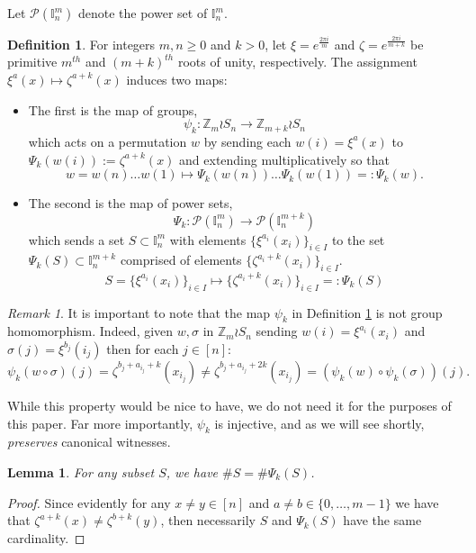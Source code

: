 \documentclass[12pt,reqno]{amsart}
\numberwithin{equation}{section}
\theoremstyle{plain}
\newtheorem{lemma}[theorem]{Lemma}
\theoremstyle{definition}
\newtheorem{definition}[theorem]{Definition}
\theoremstyle{remark}
\newtheorem{remark}[theorem]{Remark}
\newcommand{\Z}{\mathbb{Z}}
\newcommand{\I}{\mathbb{I}}
\begin{document}
Let $\mathcal{P}(\I_n^m)$ denote the power set of $\I_n^m$.

\begin{definition} \label{def:psi-map}
For integers $m,n\geq 0$ and $k>0$, let $\xi = e^{\frac{2\pi i}{ m}}$ and $\zeta = e^{\frac{2\pi i}{m+k}}$ be primitive $m^{th}$ and $(m+k)^{th}$ roots of unity, respectively. The assignment $\xi^{a}(x) \mapsto \zeta^{a+k}(x)$ induces two maps:
\begin{itemize}
\item[(I)] The first is the map of groups,  
\[\psi_k: \Z_{m} \wr S_n \longrightarrow \Z_{m+k }\wr S_n\]
which acts on a permutation $w$ by sending each $w(i)=\xi^a(x)$ to $\Psi_k(w(i)):= \zeta^{a+k}(x)$ and extending multiplicatively so that
\[
w=w(n)\dots w(1) \longmapsto \Psi_k(w(n)) \dots \Psi_k(w(1))=: \Psi_k(w).
\]
\item[(II)] The second is the map of power sets,
\[
\Psi_k: \mathcal{P}(\I_n^m) \longrightarrow \mathcal{P}(\I_n^{m+k})
\]
which sends a set $S \subset \I_n^m$ with elements $\{ \xi^{a_i}(x_i)\}_{i \in I}$ to the set $\Psi_k(S) \subset \I_n^{m+k}$ comprised of elements $\{ \zeta^{a_i+k}(x_i)\}_{i \in I}$.
\[
S = \{ \xi^{a_i}(x_i)\}_{i \in I} \longmapsto \{ \zeta^{a_i+k}(x_i)\}_{i \in I}=: \Psi_k(S)
\]
\end{itemize} 


\begin{remark}
It is important to note that the map $\psi_k$ in Definition \ref{def:psi-map} is not group homomorphism. Indeed, given $w, \sigma$ in $\Z_m\wr S_n$ sending $w(i)=\xi^{a_i}(x_i)$ and $\sigma(j)=\xi^{b_j}(i_j)$ then for each $j \in [n]$:
\[\psi_k(w \circ \sigma)(j) = \zeta^{b_j+a_{i_j}+k}(x_{i_j})\neq \zeta^{b_j+a_{i_j}+2k}(x_{i_j}) =(\psi_k(w) \circ \psi_k(\sigma))(j).\] 
\end{remark}
\end{definition}

While this property would be nice to have, we do not need it for the purposes of this paper. Far more importantly, $\psi_k$ is injective, and as we will see shortly, \emph{preserves} canonical witnesses.

\begin{lemma} \label{lem: imageSize}
    For any subset $S$, we have $\#S = \# \Psi_k(S)$.
\end{lemma}

\begin{proof}
Since evidently for any $x\neq y \in [n]$ and $a\neq b \in \{0,\dots,m-1\}$ we have that $\zeta^{a+k}(x) \neq \zeta^{b+k}(y)$, then necessarily $S$ and $\Psi_k(S)$ have the same cardinality.
\end{proof}
\end{document}
